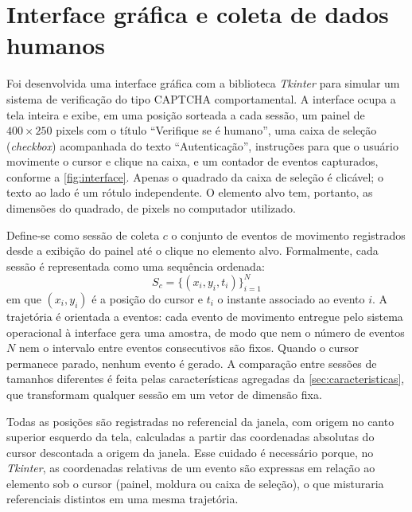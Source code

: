 
\section{Interface gráfica e coleta de dados humanos}
\label{sec:coleta}

Foi desenvolvida uma interface gráfica com a biblioteca \textit{Tkinter} para simular um sistema de verificação do tipo CAPTCHA comportamental. A interface ocupa a tela inteira e exibe, em uma posição sorteada a cada sessão, um painel de $400 \times 250$ pixels com o título ``Verifique se é humano'', uma caixa de seleção (\textit{checkbox}) acompanhada do texto ``Autenticação'', instruções para que o usuário movimente o cursor e clique na caixa, e um contador de eventos capturados, conforme a \autoref{fig:interface}. Apenas o quadrado da caixa de seleção é clicável; o texto ao lado é um rótulo independente. O elemento alvo tem, portanto, as dimensões do quadrado, de  pixels no computador utilizado.

Define-se como sessão de coleta $c$ o conjunto de eventos de movimento registrados desde a exibição do painel até o clique no elemento alvo. Formalmente, cada sessão é representada como uma sequência ordenada:
\begin{equation}
    S_c = \{(x_i, y_i, t_i)\}_{i=1}^{N}
    \label{eq:sessao}
\end{equation}
em que $(x_i, y_i)$ é a posição do cursor e $t_i$ o instante associado ao evento $i$. A trajetória é orientada a eventos: cada evento de movimento entregue pelo sistema operacional à interface gera uma amostra, de modo que nem o número de eventos $N$ nem o intervalo entre eventos consecutivos são fixos. Quando o cursor permanece parado, nenhum evento é gerado. A comparação entre sessões de tamanhos diferentes é feita pelas características agregadas da \autoref{sec:caracteristicas}, que transformam qualquer sessão em um vetor de dimensão fixa.

Todas as posições são registradas no referencial da janela, com origem no canto superior esquerdo da tela, calculadas a partir das coordenadas absolutas do cursor descontada a origem da janela. Esse cuidado é necessário porque, no \textit{Tkinter}, as coordenadas relativas de um evento são expressas em relação ao elemento sob o cursor (painel, moldura ou caixa de seleção), o que misturaria referenciais distintos em uma mesma trajetória.

